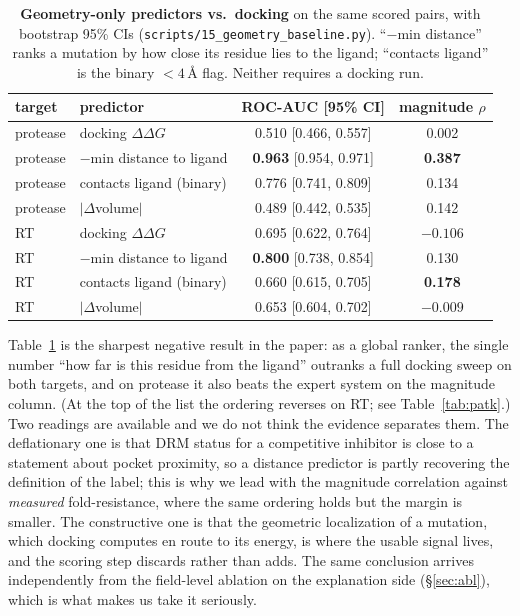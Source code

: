 \documentclass{article}
\newcommand{\ddg}{\ensuremath{\Delta\Delta G}}
\newcommand{\rhoo}{\ensuremath{\rho}}
\begin{document}
\begin{table}[h]
\centering
\caption{\textbf{Geometry-only predictors vs.\ docking} on the same scored pairs, with bootstrap 95\% CIs (\texttt{scripts/15\_geometry\_baseline.py}). ``$-$min distance'' ranks a mutation by how close its residue lies to the ligand; ``contacts ligand'' is the binary $<4$\,\AA{} flag. Neither requires a docking run.}
\label{tab:geom}
\small
\begin{tabular}{llcc}
\toprule
target & predictor & ROC-AUC [95\% CI] & magnitude \rhoo{} \\
\midrule
protease & docking \ddg{}            & 0.510 [0.466, 0.557] & 0.002 \\
protease & $-$min distance to ligand & \textbf{0.963} [0.954, 0.971] & \textbf{0.387} \\
protease & contacts ligand (binary)  & 0.776 [0.741, 0.809] & 0.134 \\
protease & $|\Delta$volume$|$        & 0.489 [0.442, 0.535] & 0.142 \\
\midrule
RT & docking \ddg{}            & 0.695 [0.622, 0.764] & $-0.106$ \\
RT & $-$min distance to ligand & \textbf{0.800} [0.738, 0.854] & 0.130 \\
RT & contacts ligand (binary)  & 0.660 [0.615, 0.705] & \textbf{0.178} \\
RT & $|\Delta$volume$|$        & 0.653 [0.604, 0.702] & $-0.009$ \\
\bottomrule
\end{tabular}
\end{table}

Table~\ref{tab:geom} is the sharpest negative result in the paper: as a global
ranker, the single number ``how far is this residue from the ligand'' outranks a
full docking sweep on both targets, and on protease it also beats the expert
system on the magnitude column. (At the top of the list the ordering reverses on
RT; see Table~\ref{tab:patk}.) Two readings are available and we do not think the evidence separates
them. The deflationary one is that DRM status for a competitive inhibitor is
close to a statement about pocket proximity, so a distance predictor is partly
recovering the definition of the label; this is why we lead with the magnitude
correlation against \emph{measured} fold-resistance, where the same ordering
holds but the margin is smaller. The constructive one is that the geometric
localization of a mutation, which docking computes en route to its energy, is
where the usable signal lives, and the scoring step discards rather than adds.
The same conclusion arrives independently from the field-level ablation on the
explanation side (\S\ref{sec:abl}), which is what makes us take it seriously.
\end{document}
